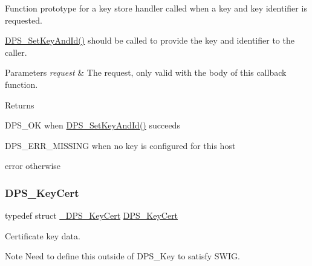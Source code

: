 Function prototype for a key store handler called when a key and key identifier is requested. 

\hyperlink{group__keystore_ga289b1c74c01c9988f04297aa082986de}{D\+P\+S\+\_\+\+Set\+Key\+And\+Id()} should be called to provide the key and identifier to the caller.


\begin{DoxyParams}{Parameters}
{\em request} & The request, only valid with the body of this callback function.\\
\hline
\end{DoxyParams}
\begin{DoxyReturn}{Returns}

\begin{DoxyItemize}
\item D\+P\+S\+\_\+\+OK when \hyperlink{group__keystore_ga289b1c74c01c9988f04297aa082986de}{D\+P\+S\+\_\+\+Set\+Key\+And\+Id()} succeeds
\item D\+P\+S\+\_\+\+E\+R\+R\+\_\+\+M\+I\+S\+S\+I\+NG when no key is configured for this host
\item error otherwise 
\end{DoxyItemize}
\end{DoxyReturn}
\mbox{\label{group__keystore_ga98b6701b118cab76965736ad720f9bcf}} 
\subsubsection{\texorpdfstring{D\+P\+S\+\_\+\+Key\+Cert}{DPS\_KeyCert}}
{\footnotesize\ttfamily typedef struct \hyperlink{struct___d_p_s___key_cert}{\+\_\+\+D\+P\+S\+\_\+\+Key\+Cert}  \hyperlink{group__keystore_ga98b6701b118cab76965736ad720f9bcf}{D\+P\+S\+\_\+\+Key\+Cert}}



Certificate key data. 

\begin{DoxyNote}{Note}
Need to define this outside of D\+P\+S\+\_\+\+Key to satisfy S\+W\+IG. 
\end{DoxyNote}
\mbox{\label{group__keystore_ga658140277e0cd5c6ccc3b7727ecaae8a}} 
